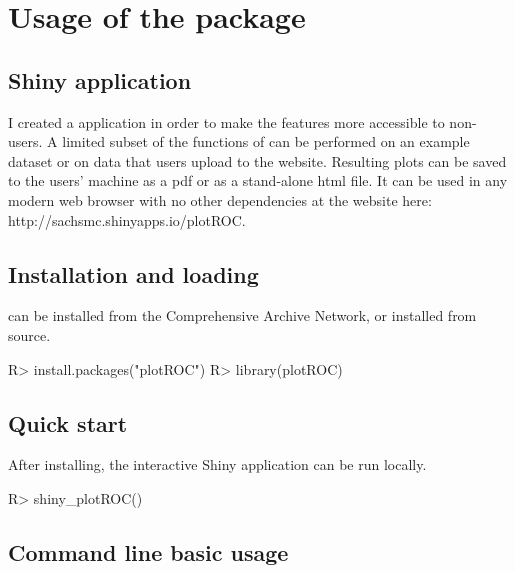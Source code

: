 \documentclass[codesnippet]{jss}
\begin{document}
\section{Usage of the package}\label{usage-of-the-package}

\subsection{Shiny application}\label{shiny-application}

I created a  application \citep{shiny} in order to make the
features more accessible to non- users. A limited subset of
the functions of  can be performed on an example dataset or
on data that users upload to the website. Resulting plots can be saved
to the users' machine as a pdf or as a stand-alone html file. It can be
used in any modern web browser with no other dependencies at the website
here: http://sachsmc.shinyapps.io/plotROC.

\subsection{Installation and loading}\label{installation-and-loading}

 can be installed from the Comprehensive 
Archive Network, or installed from source.

\begin{Schunk}
\begin{Sinput}
R> install.packages("plotROC")
R> library(plotROC)
\end{Sinput}
\end{Schunk}

\subsection{Quick start}\label{quick-start}

After installing, the interactive Shiny application can be run locally.

\begin{Schunk}
\begin{Sinput}
R> shiny_plotROC()
\end{Sinput}
\end{Schunk}

\subsection{Command line basic usage}\label{command-line-basic-usage}
\end{document}
